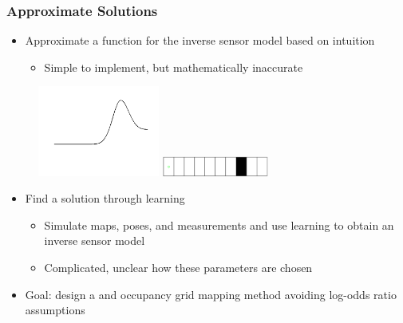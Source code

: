 \documentclass[11pt,professionalfonts,hyperref={pdftex,pdfpagemode=none,pdfstartview=FitH}]{beamer}
\renewcommand{\emph}[1]{\textit{\textbf{\color{blue}{#1}}}}
\begin{document}
\begin{frame}
\frametitle{Approximate Solutions}

\begin{minipage}[t]{7.0cm}
\begin{itemize}
	\item Approximate a function for the inverse sensor model based on intuition
	\begin{itemize}
		\item Simple to implement, but mathematically inaccurate
	\end{itemize}
\end{itemize}
\end{minipage}
\begin{minipage}[t]{3.0cm}
\begin{figure}[!htbp]
\centerline{
    \vspace*{-0.5cm}
    \includegraphics[width=4.0cm]{Approx_ISM_shortened.png}\hspace*{0.1cm}
    }
\centerline{
    \includegraphics[width=3.5cm]{1D_True_Grid.png}
    }
		\end{figure}
\end{minipage}
\vspace*{-0.5cm}
\vspace*{0.0cm}\pause
\begin{itemize}
	\item Find a solution through learning
	\begin{itemize}
		\item Simulate maps, poses, and measurements and use learning to obtain an inverse sensor model
		\item Complicated, unclear how these parameters are chosen
	\end{itemize}
	\vspace*{0.0cm}\pause
	\item Goal: design a \emph{simple} and \emph{accurate} occupancy grid mapping method avoiding log-odds ratio assumptions
\end{itemize}


\end{frame}
\end{document}
